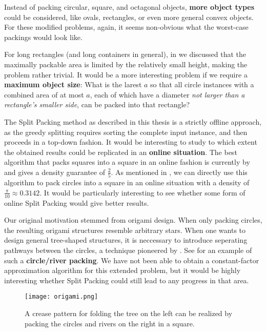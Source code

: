 \documentclass[a4paper,style=print,bibliography=totoc,nexus,lnum,extramargin]{tubsbook}
\begin{document}
Instead of packing circular, square, and octagonal objects, \textbf{more object types} could be considered, like ovals, rectangles, or even more general convex objects. For these modified problems, again, it seems non-obvious what the worst-case packings would look like.

For long rectangles (and long containers in general), in  we discussed that the maximally packable area is limited by the relatively small height, making the problem rather trivial. It would be a more interesting problem if we require a \textbf{maximum object size}: What is the larest $a$ so that all circle instances with a combined area of at most $a$, each of which have a diameter \emph{not larger than a rectangle's smaller side}, can be packed into that rectangle?

The Split Packing method as described in this thesis is a strictly offline approach, as the greedy splitting requires sorting the complete input instance, and then proceeds in a top-down fashion. It would be interesting to study to which extent the obtained results could be replicated in an \textbf{online situation}. The best algorithm that packs squares into a square in an online fashion is currently by \textcite{brubach2014improved} and gives a density guarantee of $\frac{2}{5}$. As mentioned in , we can directly use this algorithm to pack circles into a square in an online situation with a density of $\frac{\pi}{10} \approx 0.3142$. It would be particularly interesting to see whether some form of online Split Packing would give better results.

Our original motivation stemmed from origami design. When only packing circles, the resulting origami structures resemble arbitrary stars. When one wants to design general tree-shaped structures, it is neccessary to introduce seperating pathways between the circles, a technique pioneered by \textcite{lang1996computational}. See  for an example of such a \textbf{circle/river packing}. We have not been able to obtain a constant-factor approximation algorithm for this extended problem, but it would be highly interesting whether Split Packing could still lead to any progress in that area.

\begin{figure}
    \texttt{[image: origami.png]}
    \caption{A crease pattern for folding the tree on the left can be realized by packing the circles and rivers on the right in a square.}\label{fig:origami}
\end{figure}
\end{document}
